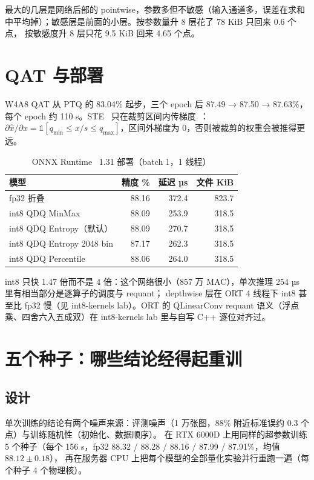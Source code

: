 \documentclass[11pt,a4paper]{ctexart}
\begin{document}
最大的几层是网络后部的 pointwise，参数多但不敏感（输入通道多，误差在求和中平均掉）；敏感层是前面的小层。按参数量升 8 层花了 78 KiB 只回来 0.6 个点，
按敏感度升 8 层只花 9.5 KiB 回来 4.65 个点。

\section{QAT 与部署}

W4A8 QAT 从 PTQ 的 83.04\% 起步，三个 epoch 后 87.49 → 87.50 → 87.63\%，每个 epoch 约 110 s。STE~\cite{bengio2013} 只在裁剪区间内传梯度~\cite{krishnamoorthi2018}：
$\partial \hat{x}/\partial x = \mathbb{1}[q_{\min}\le x/s \le q_{\max}]$，区间外梯度为 0，否则被裁剪的权重会被推得更远。

\begin{table}[H]
\centering\small
\caption{ONNX Runtime~\cite{ort} 1.31 部署（batch 1，1 线程）}\label{tab:ort}
\begin{tabular}{lrrr}
\toprule
模型 & 精度 \% & 延迟 µs & 文件 KiB \\
\midrule
fp32 折叠 & 88.16 & 372.4 & 823.7 \\
int8 QDQ MinMax & 88.09 & 253.9 & 318.5 \\
int8 QDQ Entropy（默认） & 88.09 & 270.7 & 318.5 \\
int8 QDQ Entropy 2048 bin & 87.17 & 262.3 & 318.5 \\
int8 QDQ Percentile & 88.06 & 264.0 & 318.5 \\
\bottomrule
\end{tabular}
\end{table}

int8 只快 1.47 倍而不是 4 倍：这个网络很小（857 万 MAC），单次推理 254 µs 里有相当部分是逐算子的调度与 requant；
depthwise 层在 ORT 4 线程下 int8 甚至比 fp32 慢（见 int8-kernels lab）。ORT 的 QLinearConv requant 语义（浮点乘、四舍六入五成双）在 int8-kernels lab 里与自写 C++ 逐位对齐过。

\section{五个种子：哪些结论经得起重训}\label{sec:seeds}

\subsection{设计}
单次训练的结论有两个噪声来源：评测噪声（1 万张图，88\% 附近标准误约 0.3 个点）与训练随机性（初始化、数据顺序）。
在 RTX 6000D 上用同样的超参数训练 5 个种子（每个 156 s，fp32 88.32 / 88.28 / 88.16 / 87.99 / 87.91\%，均值 $88.12\pm0.18$），
再在服务器 CPU 上把每个模型的全部量化实验并行重跑一遍（每个种子 4 个物理核）。
\end{document}
